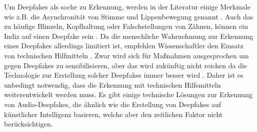 Um Deepfakes als soche zu Erkennung, werden in der Literatur einige Merkmale wie z.B. die Asynchronität von Stimme und Lippenbewegung genannt \citep[][]{Appel2022}.
Auch das zu häufige Blinzeln, Kopfhaltung oder Falschstellungen von Zähnen, können ein Indiz auf einen Deepfake sein \citep[][]{Shahzad2022}.
Da die menschliche Wahrnehmung zur Erkennung eines Deepfakes allerdings limitiert ist, empfehlen Wissenschaftler den Einsatz von technischen Hilfmitteln \citep[][]{Mueller2022}.
Zwar wird sich für Maßnahmen ausgesprochen um gegen Deepfakes zu sensibilisieren, aber das wird zukünftig nicht reichen da die Technologie zur Erstellung solcher Deepfakes immer besser wird \citep[][]{Amezaga2022}.
Daher ist es unbedingt notwendig, dass die Erkennung mit technischen Hilfsmitteln weiterentwickelt werden muss.
Es gibt einige technische Lösungen zur Erkennung von Audio-Deepfakes, die ähnlich wie die Erstellung von Deepfakes auf künstlicher Intelligenz basieren, welche aber den zeitlichen Faktor nicht berücksichtigen.